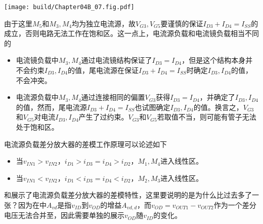 \begin{Figure}[电流源负载差分放大器]
    \texttt{[image: build/Chapter04B\_07.fig.pdf]}
\end{Figure}

由于这里$M_5$和$M_3,M_4$均为独立电流源，故$V_{G3},V_{G5}$要谨慎的保证$I_{D3}+I_{D4}=I_{SS}$的成立，否则电路无法工作在饱和区。这一点上，电流源负载和电流镜负载相当不同的
\begin{itemize}
    \item 电流镜负载中$M_3,M_4$通过电流镜结构保证了$I_{D3}=I_{D4}$，但是这个结构本身并不会约束$I_{D3},I_{D4}$的值，尾电流源在保证$I_{D3}+I_{D4}=I_{SS}$时确定$I_{D3},I_{D4}$的值，不会冲突。
    \item 电流源负载中$M_3,M_4$通过连接相同的偏置$V_{G3}$获得$I_{D3}=I_{D4}$，并确定了$I_{D3},I_{D4}$的值，然而，尾电流源$I_{D3}+I_{D4}=I_{SS}$也试图确定$I_{D3},I_{D4}$的值。换言之，$V_{G3}$和$V_{G5}$对电流$I_{D3},I_{D4}$产生了过约束。$V_{G3}$和$V_{G5}$若取值不当，则可能有管子无法处于饱和区。
\end{itemize}

电流源负载差分放大器的差模工作原理可以论述如下
\begin{itemize}
    \item 当$v_{IN1}>v_{IN2}$，$i_{D1}>i_{D3}=i_{D4}>i_{D2}$，$M_1,M_4$进入线性区。
    \item 当$v_{IN1}<v_{IN2}$，$i_{D1}<i_{D3}=i_{D4}<i_{D2}$，$M_2,M_3$进入线性区。
\end{itemize}

和展示了电流源负载差分放大器的差模特性，这里要说明的是为什么比过去多了一张？因为在中$A_{vd}$是指$v_{ID}$到$v_{OD}$的增益$A_{vd,d}$，而$v_{OD}=v_{OUT1}-v_{OUT2}$作为一个差分电压无法合并至，因此需要单独的展示$v_{OD}$随$v_{ID}$的变化。

